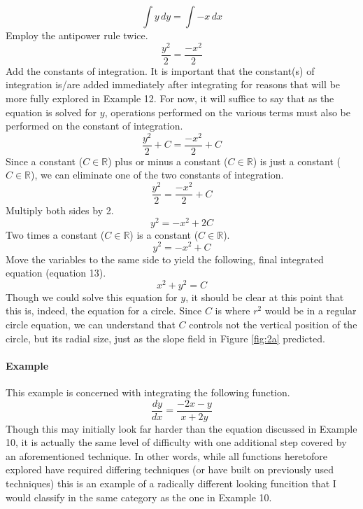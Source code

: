 \documentclass{article}
\newcounter{example}%
\newcommand{\ex}{\stepcounter{example} \paragraph{Example \theexample}}
\begin{document}
\begin{equation*}
    \int y\, dy=\int -x\, dx
\end{equation*}
Employ the antipower rule twice.
\begin{equation*}
    \frac{y^2}{2}=\frac{-x^2}{2}
\end{equation*}
Add the constants of integration. It is important that the constant(s) of integration is/are added immediately after integrating for reasons that will be more fully explored in Example 12. For now, it will suffice to say that as the equation is solved for $y$, operations performed on the various terms must also be performed on the constant of integration.
\begin{equation*}
    \frac{y^2}{2}+C=\frac{-x^2}{2}+C
\end{equation*}
Since a constant ($C\in \mathbb{R}$) plus or minus a constant ($C\in \mathbb{R}$) is just a constant ($C\in \mathbb{R}$), we can eliminate one of the two constants of integration.
\begin{equation*}
    \frac{y^2}{2}=\frac{-x^2}{2}+C
\end{equation*}
Multiply both sides by 2.
\begin{equation*}
    y^2=-x^2+2C
\end{equation*}
Two times a constant ($C\in \mathbb{R}$) is a constant ($C\in \mathbb{R}$).
\begin{equation*}
    y^2=-x^2+C
\end{equation*}
Move the variables to the same side to yield the following, final integrated equation (equation 13).
\begin{equation}
    x^2+y^2=C
\end{equation}
Though we could solve this equation for $y$, it should be clear at this point that this is, indeed, the equation for a circle. Since $C$ is where $r^2$ would be in a regular circle equation, we can understand that $C$ controls not the vertical position of the circle, but its radial size, just as the slope field in Figure \ref{fig:2a} predicted.
\ex This example is concerned with integrating the following function.$$\frac{dy}{dx}=\frac{-2x-y}{x+2y}$$
Though this may initially look far harder than the equation discussed in Example 10, it is actually the same level of difficulty with one additional step covered by an aforementioned technique. In other words, while all functions heretofore explored have required differing techniques (or have built on previously used techniques) this is an example of a radically different looking funcition that I would classify in the same category as the one in Example 10.\par
\end{document}
